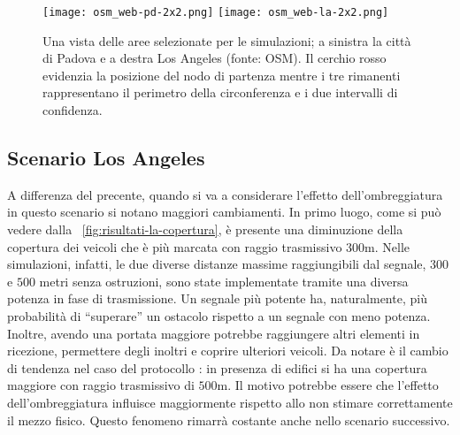 %
\begin{figure}[htbp]
	\centering
		\texttt{[image: osm\_web-pd-2x2.png]}
		\vspace{10pt}
		\texttt{[image: osm\_web-la-2x2.png]}
\caption{Una vista delle aree selezionate per le simulazioni; a sinistra la città di Padova e a destra Los Angeles (fonte: OSM).
Il cerchio rosso evidenzia la posizione del nodo di partenza mentre i tre rimanenti rappresentano il perimetro della circonferenza
e i due intervalli di confidenza.\label{fig:scenari-la-pd-osm}}
\end{figure}
%
\subsection{Scenario Los Angeles}\label{subsec:risultati-la}
A differenza del precente, quando si va a considerare l'effetto dell'ombreggiatura in questo scenario
si notano maggiori cambiamenti.
In primo luogo, come si può vedere dalla \figurename~\ref{fig:risultati-la-copertura},
è presente una diminuzione della copertura dei veicoli che è più marcata con raggio trasmissivo $300$m.
Nelle simulazioni, infatti, le due diverse distanze massime raggiungibili dal segnale,
$300$ e $500$ metri senza ostruzioni, sono state implementate tramite una diversa potenza in fase di trasmissione.
Un segnale più potente ha, naturalmente,
più probabilità di ``superare'' un ostacolo rispetto a un segnale con meno potenza.
Inoltre, avendo una portata maggiore potrebbe raggiungere altri elementi in ricezione,
permettere degli inoltri e coprire ulteriori veicoli.
Da notare è il cambio di tendenza nel caso del protocollo \statica{}:
in presenza di edifici si ha una copertura maggiore con raggio trasmissivo di $500$m.
Il motivo potrebbe essere che l'effetto dell'ombreggiatura influisce maggiormente rispetto
allo non stimare correttamente il mezzo fisico.
Questo fenomeno rimarrà costante anche nello scenario successivo.

